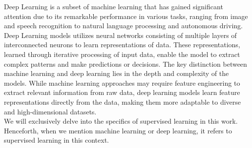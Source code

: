 Deep Learning is a subset of machine learning that has gained significant attention due to its remarkable performance in various tasks, ranging from image and speech recognition to natural language processing and autonomous driving. Deep Learning models utilizes neural networks consisting of multiple layers of interconnected neurons to learn representations of data. These representations, learned through iterative processing of input data, enable the model to extract complex patterns and make predictions or decisions. The key distinction between machine learning and deep learning lies in the depth and complexity of the models. While machine learning approaches may require feature engineering to extract relevant information from raw data, deep learning models learn feature representations directly from the data, making them more adaptable to diverse and high-dimensional datasets. \\
We will exclusively delve into the specifics of supervised learning in this work. Henceforth, when we mention machine learning or deep learning, it refers to supervised learning in this context.
